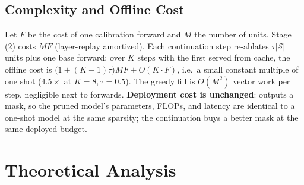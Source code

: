 \subsection{Complexity and Offline Cost}
\label{app:cost}
Let $F$ be the cost of one calibration forward and $M$ the number of units. Stage (2) costs $MF$
(layer-replay amortized). Each continuation step re-ablates $\tau|\mathcal{S}|$ units plus one base forward;
over $K$ steps with the first served from cache, the offline cost is
$\big(1+(K{-}1)\tau\big)MF + O(K\cdot F)$, i.e.\ a small constant multiple of one shot
($4.5\times$ at $K{=}8,\tau{=}0.5$). The greedy fill is $O(M^2)$ vector work per step, negligible
next to forwards. \textbf{Deployment cost is unchanged}: \method outputs a mask, so the pruned model's
parameters, FLOPs, and latency are identical to a one-shot model at the same sparsity; the continuation buys
a better mask at the same deployed budget.

\section{Theoretical Analysis}\label{app:ptheory}

